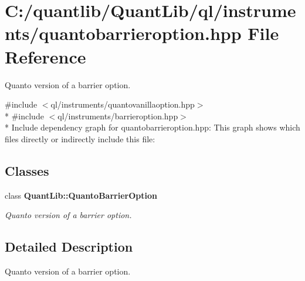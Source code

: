 \section{C\+:/quantlib/\+Quant\+Lib/ql/instruments/quantobarrieroption.hpp File Reference}
\label{quantobarrieroption_8hpp}


Quanto version of a barrier option.  


{\ttfamily \#include $<$ql/instruments/quantovanillaoption.\+hpp$>$}\\*
{\ttfamily \#include $<$ql/instruments/barrieroption.\+hpp$>$}\\*
Include dependency graph for quantobarrieroption.\+hpp\+:
This graph shows which files directly or indirectly include this file\+:
\subsection*{Classes}
\begin{DoxyCompactItemize}
\item 
class {\bf Quant\+Lib\+::\+Quanto\+Barrier\+Option}
\begin{DoxyCompactList}\small\item\em Quanto version of a barrier option. \end{DoxyCompactList}\end{DoxyCompactItemize}


\subsection{Detailed Description}
Quanto version of a barrier option. 

